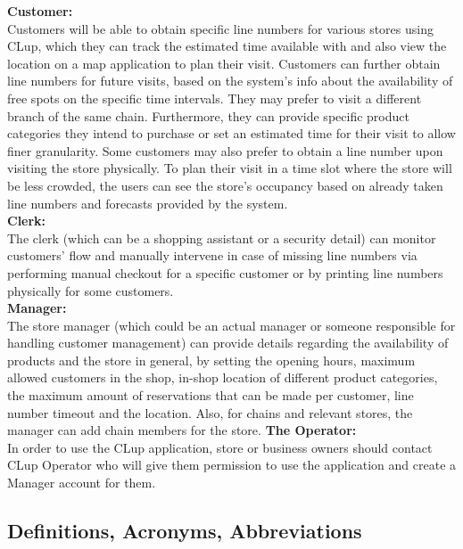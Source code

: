 \textbf{Customer:} \\
Customers will be able to obtain specific line numbers for various stores using CLup, which they can track the estimated time available with and also view the location on a map application to plan their visit.
Customers can further obtain line numbers for future visits, based on the system's info about the availability of free spots on the specific time intervals.
They may prefer to visit a different branch of the same chain.
Furthermore, they can provide specific product categories they intend to purchase or set an estimated time for their visit to allow finer granularity.
Some customers may also prefer to obtain a line number upon visiting the store physically.
To plan their visit in a time slot where the store will be less crowded, the users can see the store's occupancy based on already taken line numbers and forecasts provided by the system.
\\[0.5cm]
\textbf{Clerk:} \\
The clerk (which can be a shopping assistant or a security detail) can monitor customers' flow and manually intervene in case of missing line numbers via performing manual checkout for a specific customer or by printing line numbers physically for some customers.
\\[0.5cm]
\textbf{Manager:} \\
The store manager (which could be an actual manager or someone responsible for handling customer management) can provide details regarding the availability of products and the store in general, by setting the opening hours, maximum allowed customers in the shop, in-shop location of different product categories, the maximum amount of reservations that can be made per customer, line number timeout and the location.
Also, for chains and relevant stores, the manager can add chain members for the store.
\textbf{The Operator:} \\
In order to use the CLup application, store or business owners should contact CLup Operator who will give them permission to use the application and create a Manager account for them.


\subsection{Definitions, Acronyms, Abbreviations}
